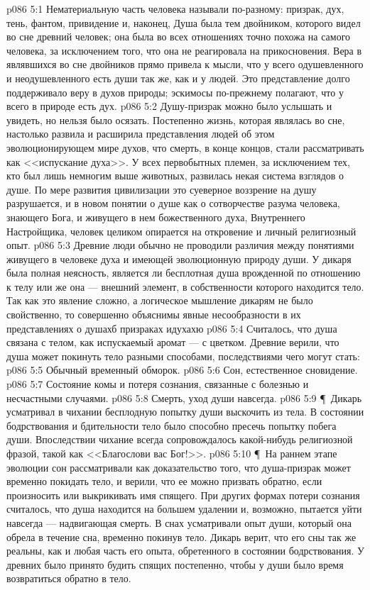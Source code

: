 \vs p086 5:1 Нематериальную часть человека называли по\hyp{}разному: призрак, дух, тень, фантом, привидение и, наконец,  Душа была тем двойником, которого видел во сне древний человек; она была во всех отношениях точно похожа на самого человека, за исключением того, что она не реагировала на прикосновения. Вера в являвшихся во сне двойников прямо привела к мысли, что у всего одушевленного и неодушевленного есть души так же, как и у людей. Это представление долго поддерживало веру в духов природы; эскимосы по\hyp{}прежнему полагают, что у всего в природе есть дух.
\vs p086 5:2 Душу\hyp{}призрак можно было услышать и увидеть, но нельзя было осязать. Постепенно жизнь, которая являлась во сне, настолько развила и расширила представления людей об этом эволюционирующем мире духов, что смерть, в конце концов, стали рассматривать как <<испускание духа>>. У всех первобытных племен, за исключением тех, кто был лишь немногим выше животных, развилась некая система взглядов о душе. По мере развития цивилизации это суеверное воззрение на душу разрушается, и в новом понятии о душе как о сотворчестве разума человека, знающего Бога, и живущего в нем божественного духа, Внутреннего Настройщика, человек целиком опирается на откровение и личный религиозный опыт.
\vs p086 5:3 Древние люди обычно не проводили различия между понятиями живущего в человеке духа и имеющей эволюционную природу души. У дикаря была полная неясность, является ли бесплотная душа врожденной по отношению к телу или же она --- внешний элемент, в собственности которого находится тело. Так как это явление сложно, а логическое мышление дикарям не было свойственно, то совершенно объяснимы явные несообразности в их представлениях о душахб призраках идухахю
\vs p086 5:4 Считалось, что душа связана с телом, как испускаемый аромат --- с цветком. Древние верили, что душа может покинуть тело разными способами, последствиями чего могут стать:
\vs p086 5:5 \bibnobreakspace Обычный временный обморок.
\vs p086 5:6 \bibnobreakspace Сон, естественное сновидение.
\vs p086 5:7 \bibnobreakspace Состояние комы и потеря сознания, связанные с болезнью и несчастными случаями.
\vs p086 5:8 \bibnobreakspace Смерть, уход души навсегда.
\vs p086 5:9 \P\ Дикарь усматривал в чихании бесплодную попытку души выскочить из тела. В состоянии бодрствования и бдительности тело было способно пресечь попытку побега души. Впоследствии чихание всегда сопровождалось какой\hyp{}нибудь религиозной фразой, такой как <<Благослови вас Бог!>>.
\vs p086 5:10 \P\ На раннем этапе эволюции сон рассматривали как доказательство того, что душа\hyp{}призрак может временно покидать тело, и верили, что ее можно призвать обратно, если произносить или выкрикивать имя спящего. При других формах потери сознания считалось, что душа находится на большем удалении и, возможно, пытается уйти навсегда --- надвигающая смерть. В снах усматривали опыт души, который она обрела в течение сна, временно покинув тело. Дикарь верит, что его сны так же реальны, как и любая часть его опыта, обретенного в состоянии бодрствования. У древних было принято будить спящих постепенно, чтобы у души было время возвратиться обратно в тело.
